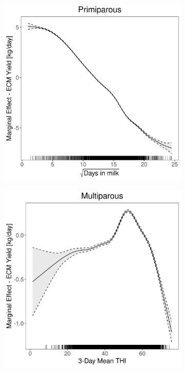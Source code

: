\begin{figure}[H]
\begin{subfigure}[b]{0.45\textwidth}
    \end{subfigure}
    \hspace{0.05\textwidth} %
    \begin{subfigure}[b]{0.45\textwidth}
        \centering
        \includegraphics[width=\textwidth]{thesis/figures/models/ecm/before2010/sf_ecm_before2010/sf_ecm_before2010_marginal_dim_milk_primi.png}
    \end{subfigure}
    \begin{subfigure}[b]{0.45\textwidth}
        \centering
        \includegraphics[width=\textwidth]{thesis/figures/models/ecm/before2010/sf_ecm_before2010/sf_ecm_before2010_marginal_thi_milk_multi.png}

\end{subfigure}
\end{figure}
